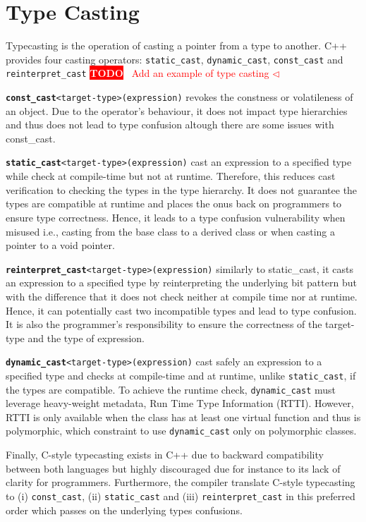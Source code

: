 \documentclass[a4paper,11pt,oneside]{report}
\newcommand{\todobox}[3]{%
       \colorbox{#1}{\textcolor{white}{\sffamily\bfseries\scriptsize #2}}%
       ~\textcolor{#1}{#3} %
       \textcolor{#1}{$\triangleleft$}%
}
\newcommand{\adrbqt}[1]{\todobox{red}{TODO}{#1}}
\begin{document}
\section{Type Casting} \label{sec:cpp_type_casting}
Typecasting is the operation of casting a pointer from a type to another. C++ provides four casting operators: \texttt{static\_cast}, \texttt{dynamic\_cast}, 
\texttt{const\_cast} and \texttt{reinterpret\_cast}
\adrbqt{Add an example of type casting}

\texttt{\textbf{const\_cast}<target-type>(expression)} revokes the constness or volatileness of an object. Due to the operator's behaviour, it does not impact type hierarchies and 
thus does not lead to type confusion altough there are some issues with const\_cast.

\texttt{\textbf{static\_cast}<target-type>(expression)} cast an expression to a specified type while check at compile-time but not at runtime. Therefore, this reduces cast verification to checking the types 
in the type hierarchy. It does not guarantee the types are compatible at runtime and places the onus back on programmers to ensure type correctness. Hence, it leads to a type confusion vulnerability when misused i.e.,
casting from the base class to a derived class or when casting a pointer to a void pointer.

\texttt{\textbf{reinterpret\_cast}<target-type>(expression)} similarly to static\_cast, it casts an expression to a specified type by reinterpreting the underlying bit pattern but with the difference 
that it does not check neither at compile time nor at runtime. Hence, it can potentially cast two incompatible types and lead to type confusion. 
It is also the programmer's responsibility to ensure the correctness of the target-type and the type of expression.

\texttt{\textbf{dynamic\_cast}<target-type>(expression)} cast safely an expression to a specified type and checks at compile-time and at runtime, unlike \texttt{static\_cast}, if the types are compatible. 
To achieve the runtime check, \texttt{dynamic\_cast} must leverage heavy-weight metadata, Run Time Type Information (RTTI). However, RTTI is only available when the class has at least one virtual function 
and thus is polymorphic, which constraint to use \texttt{dynamic\_cast} only on polymorphic classes.

Finally, C-style typecasting exists in C++ due to backward compatibility between both languages but highly discouraged due for instance to its lack of clarity for programmers. 
Furthermore, the compiler translate C-style typecasting to (i) \texttt{const\_cast}, (ii) \texttt{static\_cast} and (iii) \texttt{reinterpret\_cast} in this preferred order which passes on the underlying types confusions.
\end{document}
